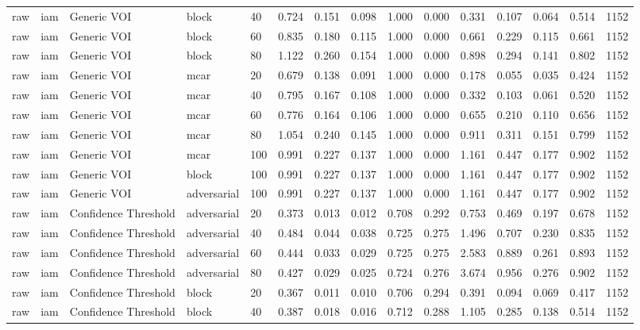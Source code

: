 \begin{table}[!ht]
{\begin{tabular}{lllllllllllllll}
raw & iam & Generic VOI & block & 40 & 0.724 & 0.151 & 0.098 & 1.000 & 0.000 & 0.331 & 0.107 & 0.064 & 0.514 & 1152 \\
raw & iam & Generic VOI & block & 60 & 0.835 & 0.180 & 0.115 & 1.000 & 0.000 & 0.661 & 0.229 & 0.115 & 0.661 & 1152 \\
raw & iam & Generic VOI & block & 80 & 1.122 & 0.260 & 0.154 & 1.000 & 0.000 & 0.898 & 0.294 & 0.141 & 0.802 & 1152 \\
raw & iam & Generic VOI & mcar & 20 & 0.679 & 0.138 & 0.091 & 1.000 & 0.000 & 0.178 & 0.055 & 0.035 & 0.424 & 1152 \\
raw & iam & Generic VOI & mcar & 40 & 0.795 & 0.167 & 0.108 & 1.000 & 0.000 & 0.332 & 0.103 & 0.061 & 0.520 & 1152 \\
raw & iam & Generic VOI & mcar & 60 & 0.776 & 0.164 & 0.106 & 1.000 & 0.000 & 0.655 & 0.210 & 0.110 & 0.656 & 1152 \\
raw & iam & Generic VOI & mcar & 80 & 1.054 & 0.240 & 0.145 & 1.000 & 0.000 & 0.911 & 0.311 & 0.151 & 0.799 & 1152 \\
raw & iam & Generic VOI & mcar & 100 & 0.991 & 0.227 & 0.137 & 1.000 & 0.000 & 1.161 & 0.447 & 0.177 & 0.902 & 1152 \\
raw & iam & Generic VOI & block & 100 & 0.991 & 0.227 & 0.137 & 1.000 & 0.000 & 1.161 & 0.447 & 0.177 & 0.902 & 1152 \\
raw & iam & Generic VOI & adversarial & 100 & 0.991 & 0.227 & 0.137 & 1.000 & 0.000 & 1.161 & 0.447 & 0.177 & 0.902 & 1152 \\
raw & iam & Confidence Threshold & adversarial & 20 & 0.373 & 0.013 & 0.012 & 0.708 & 0.292 & 0.753 & 0.469 & 0.197 & 0.678 & 1152 \\
raw & iam & Confidence Threshold & adversarial & 40 & 0.484 & 0.044 & 0.038 & 0.725 & 0.275 & 1.496 & 0.707 & 0.230 & 0.835 & 1152 \\
raw & iam & Confidence Threshold & adversarial & 60 & 0.444 & 0.033 & 0.029 & 0.725 & 0.275 & 2.583 & 0.889 & 0.261 & 0.893 & 1152 \\
raw & iam & Confidence Threshold & adversarial & 80 & 0.427 & 0.029 & 0.025 & 0.724 & 0.276 & 3.674 & 0.956 & 0.276 & 0.902 & 1152 \\
raw & iam & Confidence Threshold & block & 20 & 0.367 & 0.011 & 0.010 & 0.706 & 0.294 & 0.391 & 0.094 & 0.069 & 0.417 & 1152 \\
raw & iam & Confidence Threshold & block & 40 & 0.387 & 0.018 & 0.016 & 0.712 & 0.288 & 1.105 & 0.285 & 0.138 & 0.514 & 1152 \\

\end{tabular}}
\end{table}
